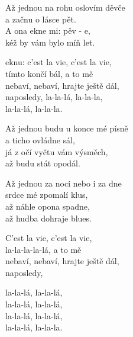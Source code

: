 
\ve{}
Až jednou na rohu oslovím děvče\\
a začnu o lásce pět.\\
A ona ekne mi: pěv - e,\\
kéž by vám bylo míň let.

\cho{}
eknu: c'est la vie, c'est la vie,\\
tímto končí bál, a to mě\\
nebaví, nebaví, hrajte ještě dál,\\
naposledy, la-la-lá, la-la-la,\\
la-la-lá, la-la-la.

\ve{}
Až jednou budu u konce mé písně\\
a ticho ovládne sál,\\
já z očí vyčtu vám výsměch,\\
až budu stát opodál.

\cho{}

\ve{}
Až jednou za noci nebo i za dne\\
srdce mé zpomalí klus,\\
až náhle opona spadne,\\
až hudba dohraje blues.

\cho{}

\cho{}
C'est la vie, c'est la vie,\\
la-la-la-la-lá, a to mě\\
nebaví, nebaví, hrajte ještě dál,\\
naposledy,

\re{}
la-la-lá, la-la-lá,\\
la-la-lá, la-la-lá,\\
la-la-lá, la-la-lá,\\
la-la-lá, la-la-la.

\esong